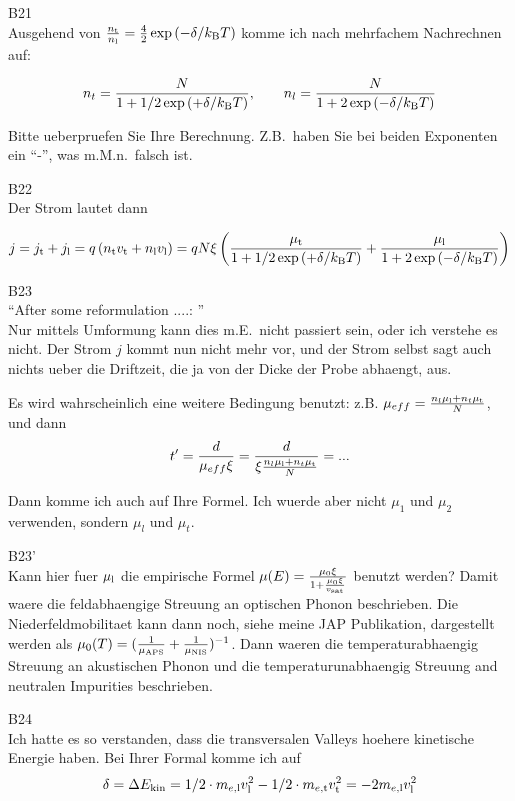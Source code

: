 B21\\
Ausgehend von $ \frac{n_{\textrm{t}}}{n_{\textrm{l}}} = \frac{4}{2}\exp{(-\delta/k_{\textrm{B}}T)}$ komme ich nach mehrfachem Nachrechnen auf:

\begin{equation}
 n_t = \frac{N}{1+1/2 \exp{(+\delta/k_{\textrm{B}}T)}}, \qquad n_l = \frac{N}{1+ 2\exp{(-\delta/k_{\textrm{B}}T)}}
\end{equation}

\noindent
Bitte ueberpruefen Sie Ihre Berechnung. Z.B.\ haben Sie bei beiden Exponenten ein ``-'', was m.M.n.\ falsch ist. 

B22\\
Der Strom lautet dann

\begin{equation}
 j = j_{\textrm{t}} + j_{\textrm{l}} = \mathnormal{q}\left( n_{\textrm{t}} v_{\textrm{t}} + n_{\textrm{l}} v_{\textrm{l}} \right) = \mathnormal{q} N \xi \left( \frac{\mu_{\textrm{t}}}{1+1/2\exp{(+\delta/k_{\textrm{B}}T)}}  + \frac{\mu_{\textrm{l}}}{1+2\exp{(-\delta/k_{\textrm{B}}T)}}\right) 
\end{equation}

B23\\
``After some reformulation ....: ''\\
Nur mittels Umformung kann dies m.E.\ nicht passiert sein, oder ich verstehe es nicht. 
Der Strom $j$ kommt nun nicht mehr vor, und der Strom selbst sagt auch nichts ueber die Driftzeit, die ja von der Dicke der Probe abhaengt, aus.
 
Es wird wahrscheinlich eine weitere Bedingung benutzt: z.B. $\mu_{eff} = \frac{n_l \mu_{\textrm{l}} + n_t \mu_{\textrm{t}}}{N}$, und dann
\begin{equation}
 \mathnormal{t'} = \frac{d}{\mu_{eff}\xi} = \frac{d}{\xi \frac{n_l \mu_{\textrm{l}} + n_t \mu_{\textrm{t}}}{N}} = ...
\end{equation}

\noindent
Dann komme ich auch auf Ihre Formel. 
Ich wuerde aber nicht $\mu_1$ und $\mu_2$ verwenden, sondern $\mu_l$ und $\mu_t$.

B23'\\
Kann hier fuer $\mu_{\textrm{l}}$ die empirische Formel $\mu(E) = \frac{\mu_0 \xi}{1+ \frac{\mu_0 \xi}{v_{\textrm{sat}}}}$ benutzt werden?
Damit waere die feldabhaengige Streuung an optischen Phonon beschrieben. 
Die Niederfeldmobilitaet kann dann noch, siehe meine JAP Publikation, dargestellt werden als $\mu_0 (T) = (\frac{1}{\mu_{\textrm{APS}}} + \frac{1}{\mu_{\textrm{NIS}}})^{-1}$. 
Dann waeren die temperaturabhaengig Streuung an akustischen Phonon und die temperaturunabhaengig Streuung and neutralen Impurities beschrieben. 

B24\\
Ich hatte es so verstanden, dass die transversalen Valleys hoehere kinetische Energie haben. 
Bei Ihrer Formal komme ich auf
\begin{equation}
 \delta = \Delta E_{\textrm{kin}} = 1/2 \cdot m_{\mathnormal{e},\textrm{l}} v_{\textrm{l}}^2 - 1/2 \cdot m_{\mathnormal{e},\textrm{t}} v_{\textrm{t}}^2 = - 2m_{\mathnormal{e},\textrm{l}} v_{\textrm{l}}^2
\end{equation}

